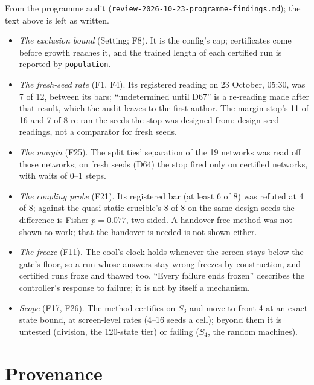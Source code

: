 \documentclass[11pt]{article}
\begin{document}
From the programme audit (\texttt{review-2026-10-23-programme-findings.md}); the text above is left
as written.
\begin{itemize}
  \item \emph{The exclusion bound} (Setting; F8). It is the config's cap; certificates come before
  growth reaches it, and the trained length of each certified run is reported by \texttt{population}.
  \item \emph{The fresh-seed rate} (F1, F4). Its registered reading on 23 October, 05:30, was 7 of 12,
  between its bars; ``undetermined until D67'' is a re-reading made after that result, which the
  audit leaves to the first author. The margin stop's 11 of 16 and 7 of 8 re-ran the seeds the stop
  was designed from: design-seed readings, not a comparator for fresh seeds.
  \item \emph{The margin} (F25). The split ties' separation of the 19 networks was read off those
  networks; on fresh seeds (D64) the stop fired only on certified networks, with waits of 0--1 steps.
  \item \emph{The coupling probe} (F21). Its registered bar (at least 6 of 8) was refuted at 4 of 8;
  against the quasi-static crucible's 8 of 8 on the same design seeds the difference is Fisher
  $p = 0.077$, two-sided. A handover-free method was not shown to work; that the handover is needed
  is not shown either.
  \item \emph{The freeze} (F11). The cool's clock holds whenever the screen stays below the gate's
  floor, so a run whose answers stay wrong freezes by construction, and certified runs froze and
  thawed too. ``Every failure ends frozen'' describes the controller's response to failure; it is
  not by itself a mechanism.
  \item \emph{Scope} (F17, F26). The method certifies on $S_3$ and move-to-front-4 at an exact state
  bound, at screen-level rates (4--16 seeds a cell); beyond them it is untested (division, the
  120-state tier) or failing ($S_4$, the random machines).
\end{itemize}

\section{Provenance}
\label{sec:provenance}
\end{document}
